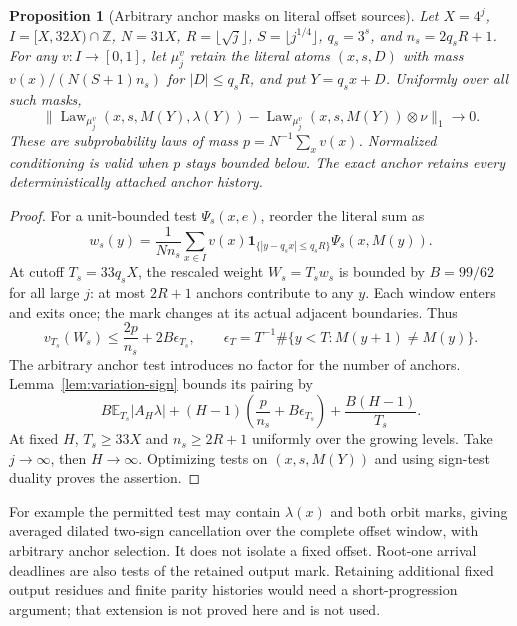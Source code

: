 \documentclass[11pt]{amsart}
\newtheorem{proposition}[theorem]{Proposition}
\theoremstyle{definition}
\theoremstyle{remark}
\newcommand{\Z}{\mathbb Z}
\newcommand{\E}{\mathbb E}
\newcommand{\one}{\mathbf 1}
\begin{document}
\begin{proposition}[Arbitrary anchor masks on literal offset sources]\label{prop:source-sign}
Let $X=4^j$, $I=[X,32X)\cap\Z$, $N=31X$, $R=\lfloor\sqrt j\rfloor$, $S=\lfloor j^{1/4}\rfloor$, $q_s=3^s$, and $n_s=2q_sR+1$. For any $v:I\to[0,1]$, let $\mu_j^v$ retain the literal atoms $(x,s,D)$ with mass $v(x)/(N(S+1)n_s)$ for $|D|\le q_sR$, and put $Y=q_sx+D$. Uniformly over all such masks,
\[
 \|\operatorname{Law}_{\mu_j^v}(x,s,M(Y),\lambda(Y))
   -\operatorname{Law}_{\mu_j^v}(x,s,M(Y))\otimes\nu\|_1\to0.
\]
These are subprobability laws of mass $p=N^{-1}\sum_xv(x)$. Normalized conditioning is valid when $p$ stays bounded below. The exact anchor retains every deterministically attached anchor history.
\end{proposition}
\begin{proof}
For a unit-bounded test $\Psi_s(x,e)$, reorder the literal sum as
\[
 w_s(y)=\frac1{Nn_s}\sum_{x\in I}v(x)
     \one_{\{|y-q_sx|\le q_sR\}}\Psi_s(x,M(y)).
\]
At cutoff $T_s=33q_sX$, the rescaled weight $W_s=T_sw_s$ is bounded by $B=99/62$ for all large $j$: at most $2R+1$ anchors contribute to any $y$. Each window enters and exits once; the mark changes at its actual adjacent boundaries. Thus
\[
 v_{T_s}(W_s)\le \frac{2p}{n_s}+2B\epsilon_{T_s},\qquad
 \epsilon_T=T^{-1}\#\{y<T:M(y+1)\ne M(y)\}.
\]
The arbitrary anchor test introduces no factor for the number of anchors. Lemma~\ref{lem:variation-sign} bounds its pairing by
\[
 B\E_{T_s}|A_H\lambda|+(H-1)\left(\frac p{n_s}+B\epsilon_{T_s}\right)
       +\frac{B(H-1)}{T_s}.
\]
At fixed $H$, $T_s\ge33X$ and $n_s\ge2R+1$ uniformly over the growing levels. Take $j\to\infty$, then $H\to\infty$. Optimizing tests on $(x,s,M(Y))$ and using sign-test duality proves the assertion.
\end{proof}
For example the permitted test may contain $\lambda(x)$ and both orbit marks, giving averaged dilated two-sign cancellation over the complete offset window, with arbitrary anchor selection. It does not isolate a fixed offset. Root-one arrival deadlines are also tests of the retained output mark. Retaining additional fixed output residues and finite parity histories would need a short-progression argument; that extension is not proved here and is not used.
\end{document}
